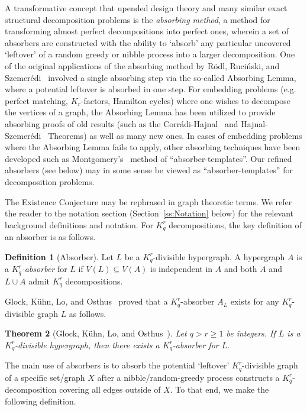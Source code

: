 \documentclass[11pt]{article}
\newcounter{i}
\theoremstyle{plain}
\newtheorem{thm}{Theorem}[section]
\theoremstyle{plain} %
\theoremstyle{definition}
\newtheorem{definition}[thm]{Definition}
\begin{document}
A transformative concept that upended design theory and many similar exact structural decomposition problems is the \emph{absorbing method}, a method for transforming almost perfect decompositions into perfect ones, wherein a set of absorbers are constructed with the ability to `absorb' any particular uncovered `leftover' of a random greedy or nibble process into a larger decomposition. One of the original applications of the absorbing method by R\"odl, Ruci\'nski, and Szemer\'edi~\cite{RRS06} involved a single absorbing step via the so-called Absorbing Lemma, where a potential leftover is absorbed in one step. For embedding problems (e.g. perfect matching, $K_r$-factors, Hamilton cycles) where one wishes to decompose the vertices of a graph, the Absorbing Lemma has been utilized to provide absorbing proofs of old results (such as the Corr\'adi-Hajnal~\cite{CH63} and Hajnal-Szemer\'edi~\cite{HS70} Theorems) as well as many new ones. In cases of embedding problems where the Absorbing Lemma fails to apply, other absorbing techniques have been developed such as Montgomery's~\cite{M19b} method of ``absorber-templates''. Our refined absorbers (see below) may in some sense be viewed as ``absorber-templates'' for decomposition problems. 

The Existence Conjecture may be rephrased in graph theoretic terms. We refer the reader to the notation section (Section~\ref{ss:Notation} below) for the relevant background definitions and notation. For $K_q^r$ decompositions, the key definition of an absorber is as follows.

\begin{definition}[Absorber]
Let $L$ be a $K_q^r$-divisible hypergraph. A hypergraph $A$ is a \emph{$K_q^r$-absorber} for $L$ if $V(L)\subseteq V(A)$ is independent in $A$ and both $A$ and $L\cup A$ admit $K_q^r$ decompositions.
\end{definition}

Glock, K\"uhn, Lo, and Osthus~\cite{GKLO16} proved that a $K_q^r$-absorber $A_L$ exists for any $K_q^r$-divisible graph $L$ as follows.  

\begin{thm}[Glock, K\"uhn, Lo, and Osthus~\cite{GKLO16}]\label{thm:AbsorberExistence}
Let $q > r\ge 1$ be integers. If $L$ is a $K_q^r$-divisible hypergraph, then there exists a $K_q^r$-absorber for $L$.
\end{thm}

The main use of absorbers is to absorb the potential `leftover' $K_q^r$-divisible graph of a specific set/graph $X$ after a nibble/random-greedy process constructs a $K_q^r$-decomposition covering all edges outside of $X$. To that end, we make the following definition.
\end{document}
